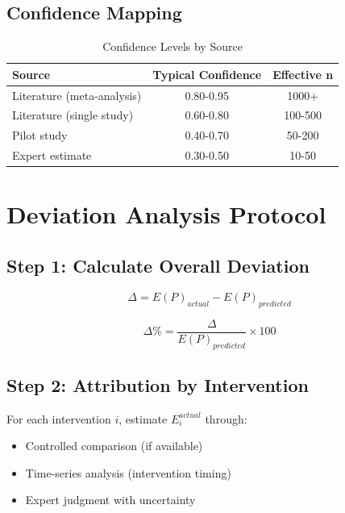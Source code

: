 \subsection{Confidence Mapping}

\begin{table}[h]
\centering
\begin{tabular}{lcc}
\toprule
\textbf{Source} & \textbf{Typical Confidence} & \textbf{Effective n} \\
\midrule
Literature (meta-analysis) & 0.80-0.95 & 1000+ \\
Literature (single study) & 0.60-0.80 & 100-500 \\
Pilot study & 0.40-0.70 & 50-200 \\
Expert estimate & 0.30-0.50 & 10-50 \\
\bottomrule
\end{tabular}
\caption{Confidence Levels by Source}
\end{table}

\section{Deviation Analysis Protocol}

\subsection{Step 1: Calculate Overall Deviation}

\begin{equation}
\Delta = E(P)_{actual} - E(P)_{predicted}
\end{equation}

\begin{equation}
\Delta\% = \frac{\Delta}{E(P)_{predicted}} \times 100
\end{equation}

\subsection{Step 2: Attribution by Intervention}

For each intervention $i$, estimate $E_i^{actual}$ through:
\begin{itemize}
    \item Controlled comparison (if available)
    \item Time-series analysis (intervention timing)
    \item Expert judgment with uncertainty
\end{itemize}

